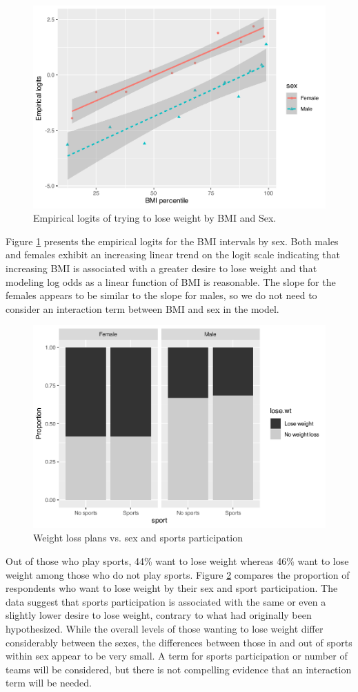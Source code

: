 \documentclass[
]{krantz}
\begin{document}
\begin{figure}

{\centering \includegraphics[width=0.6\linewidth]{bookdown-BeyondMLR_files/figure-latex/logitBMIsex-1} 

}

\caption{Empirical logits of trying to lose weight by BMI and Sex.}\label{fig:logitBMIsex}
\end{figure}

Figure \ref{fig:logitBMIsex} presents the empirical logits for the BMI intervals by sex. Both males and females exhibit an increasing linear trend on the logit scale indicating that increasing BMI is associated with a greater desire to lose weight and that modeling log odds as a linear function of BMI is reasonable. The slope for the females appears to be similar to the slope for males, so we do not need to consider an interaction term between BMI and sex in the model.

\begin{figure}

{\centering \includegraphics[width=0.6\linewidth]{bookdown-BeyondMLR_files/figure-latex/mosaicsexsports-1} 

}

\caption{Weight loss plans vs. sex and sports participation}\label{fig:mosaicsexsports}
\end{figure}

Out of those who play sports, 44\% want to lose weight whereas 46\% want to lose weight among those who do not play sports. Figure \ref{fig:mosaicsexsports} compares the proportion of respondents who want to lose weight by their sex and sport participation. The data suggest that sports participation is associated with the same or even a slightly lower desire to lose weight, contrary to what had originally been hypothesized. While the overall levels of those wanting to lose weight differ considerably between the sexes, the differences between those in and out of sports within sex appear to be very small. A term for sports participation or number of teams will be considered, but there is not compelling evidence that an interaction term will be needed.
\end{document}
